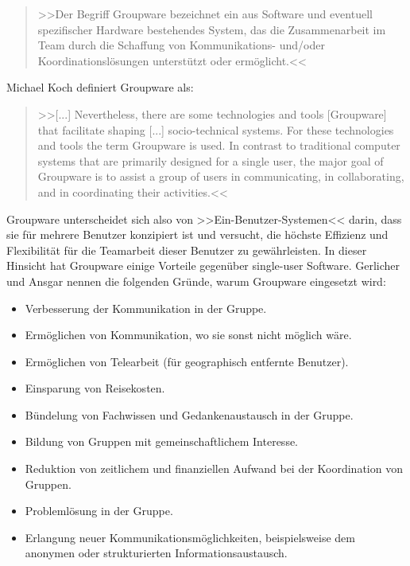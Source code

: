 	\medskip\begin{quote}{>>Der Begriff Groupware bezeichnet ein aus Software und eventuell spezifischer Hardware bestehendes System, das die Zusammenarbeit im Team durch die Schaffung von Kommunikations- und/oder Koordinationslösungen unterstützt oder ermöglicht.<< \citep{Gerlicher:2007p241}}\end{quote}
	
	\medskip Michael Koch definiert Groupware als:
	
	\medskip\begin{quote}{>>[...] Nevertheless, there are some technologies and tools [Groupware] that facilitate shaping [...] socio-technical systems. For these technologies and tools the term Groupware is used. In contrast to traditional computer systems that are primarily designed for a single user, the major goal of Groupware is to assist a group of users in communicating, in collaborating, and in coordinating their activities.<< \citep{Koch2008}}\end{quote}
	
	\medskip Groupware unterscheidet sich also von >>Ein-Benutzer-Systemen<< darin, dass sie für mehrere Benutzer konzipiert ist und versucht, die höchste Effizienz und Flexibilität für die Teamarbeit dieser Benutzer zu gewährleisten. In dieser Hinsicht hat Groupware einige Vorteile gegenüber single-user Software. Gerlicher und Ansgar nennen die folgenden Gründe, warum Groupware eingesetzt wird: \citep{Gerlicher:2007p241}
	
	\begin{itemize}
		\item {Verbesserung der Kommunikation in der Gruppe.}
		\item {Ermöglichen von Kommunikation, wo sie sonst nicht möglich wäre.}
		\item {Ermöglichen von Telearbeit (für geographisch entfernte Benutzer).}
		\item {Einsparung von Reisekosten.}
		\item {Bündelung von Fachwissen und Gedankenaustausch in der Gruppe.}
		\item {Bildung von Gruppen mit gemeinschaftlichem Interesse.}
		\item {Reduktion von zeitlichem und finanziellen Aufwand bei der Koordination von Gruppen.}
		\item {Problemlösung in der Gruppe.}
		\item {Erlangung neuer Kommunikationsmöglichkeiten, beispielsweise dem anonymen oder strukturierten Informationsaustausch.}
	\end{itemize}
	
